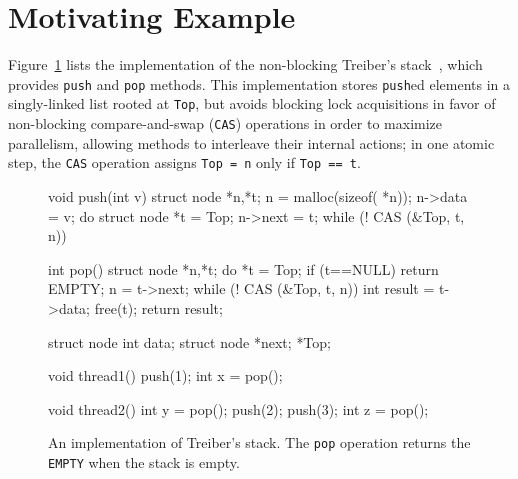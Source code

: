 
\section{Motivating Example}
\label{sec:motivation}

Figure~\ref{fig:treiber} lists the implementation of the non-blocking Treiber's
stack~\cite{Treiber'86}, which provides {\tt push} and {\tt pop} methods. This
implementation stores {\tt push}ed elements in a singly-linked list rooted at
{\tt Top}, but avoids blocking lock acquisitions in favor of non-blocking
compare-and-swap ({\tt CAS}) operations in order to maximize parallelism,
allowing methods to interleave their internal actions; in one atomic step, the
{\tt CAS} operation assigns {\tt Top = n} only if {\tt Top == t}.


\begin{figure}[t]
  \scriptsize
  \begin{minipage}[t]{45mm}
    \begin{program}
void push(int v) {
  struct node *n,*t;
  n = malloc(sizeof( *n));
  n->data = v;
  do {
    struct node *t = Top;
    n->next = t;
  } while (! CAS (&Top, t, n))
}

int pop() {
  struct node *n,*t;
  do {
    *t = Top;
    if (t==NULL) return EMPTY;
    n = t->next;
  } while (! CAS (&Top, t, n))
  int result = t->data;
  free(t);
  return result;
}
    \end{program}
  \end{minipage}
  \begin{minipage}[t]{35mm}
    \begin{program}
struct node {
  int data;
  struct node *next;
} *Top;  

void thread1() {
  push(1);
  int x = pop();
}

void thread2() {
  int y = pop();
  push(2);
  push(3);
  int z = pop();
}
    \end{program}
  \end{minipage}

  \caption{An implementation of Treiber's stack. The {\tt pop} operation
  returns the {\tt EMPTY} when the stack is empty.}
  \label{fig:treiber}
  \vspace{-3mm}
\end{figure}

